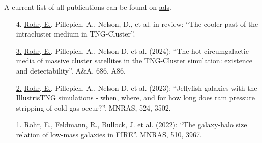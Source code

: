 \documentclass[a4paper,10pt,oneside]{article}
\begin{document}
\noindent{}

\vspace{5.5pt}

\noindent A current list of all publications can be found on \href{https://ui.adsabs.harvard.edu/public-libraries/mi3QHw\_bSa6qgOlOj3c-sg}{ads}. 

\vspace{5.5pt} 

\begin{enumerate}[wide, labelwidth=!, labelindent=-11pt, parsep=0pt]
    \item[4.] \underline{Rohr, E.}, Pillepich, A., Nelson, D., et al. in review: ``The cooler past of the intracluster medium in TNG-Cluster''. 
    \item[\href{https://ui.adsabs.harvard.edu/abs/2024A\%26A...686A..86R/abstract}{3.}] \underline{Rohr, E.}, Pillepich, A., Nelson D. et al. (2024): ``The hot circumgalactic media of massive cluster satellites in the TNG-Cluster simulation: existence and detectability''. A\&A, 686, A86.
    \item[\href{https://ui.adsabs.harvard.edu/abs/2023MNRAS.524.3502R/abstract}{2.}] \underline{Rohr, E.}, Pillepich, A., Nelson D. et al. (2023): ``Jellyfish galaxies with the IllustrisTNG simulations - when, where, and for how long does ram pressure stripping of cold gas occur?''. MNRAS, 524, 3502.
    \item[\href{https://ui.adsabs.harvard.edu/abs/2022MNRAS.510.3967R/abstract}{1.}] \underline{Rohr, E.}, Feldmann, R., Bullock, J. et al. (2022): ``The galaxy-halo size relation of low-mass galaxies in FIRE''. MNRAS, 510, 3967.
\end{enumerate}
\end{document}
